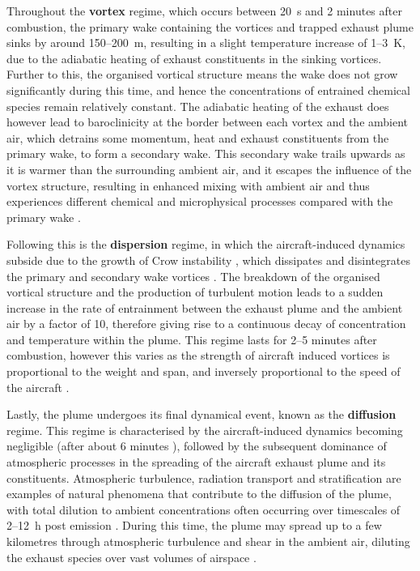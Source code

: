 Throughout the \textbf{vortex} regime, which occurs between 20~s and 2 minutes after combustion, the primary wake containing the vortices and trapped exhaust plume sinks by around 150--200~m, resulting in a slight temperature increase of 1--3~K, due to the adiabatic heating of exhaust constituents in the sinking vortices. Further to this, the organised vortical structure means the wake does not grow significantly during this time, and hence the concentrations of entrained chemical species remain relatively constant. The adiabatic heating of the exhaust does however lead to baroclinicity at the border between each vortex and the ambient air, which detrains some momentum, heat and exhaust constituents from the primary wake, to form a secondary wake. This secondary wake trails upwards as it is warmer than the surrounding ambient air, and it escapes the influence of the vortex structure, resulting in enhanced mixing with ambient air and thus experiences different chemical and microphysical processes compared with the primary wake \cite{Gerz1998}.

Following this is the \textbf{dispersion} regime, in which the aircraft-induced dynamics subside due to the growth of Crow instability \cite{Crow1970}, which dissipates and disintegrates the primary and secondary wake vortices \cite{Paoli2016}. The breakdown of the organised vortical structure and the production of turbulent motion leads to a sudden increase in the rate of entrainment between the exhaust plume and the ambient air by a factor of 10, therefore giving rise to a continuous decay of concentration and temperature within the plume. This regime lasts for 2--5 minutes after combustion, however this varies as the strength of aircraft induced vortices is proportional to the weight and span, and inversely proportional to the speed of the aircraft \cite{Gerz1998}.

Lastly, the plume undergoes its final dynamical event, known as the \textbf{diffusion} regime. This regime is characterised by the aircraft-induced dynamics becoming negligible (after about 6 minutes \cite{Unterstrasser2014}), followed by the subsequent dominance of atmospheric processes in the spreading of the aircraft exhaust plume and its constituents. Atmospheric turbulence, radiation transport and stratification are examples of natural phenomena that contribute to the diffusion of the plume, with total dilution to ambient concentrations often occurring over timescales of 2--12~h post emission \cite{EPA1992}. During this time, the plume may spread up to a few kilometres through atmospheric turbulence and shear in the ambient air, diluting the exhaust species over vast volumes of airspace \cite{Schumann1995}.

